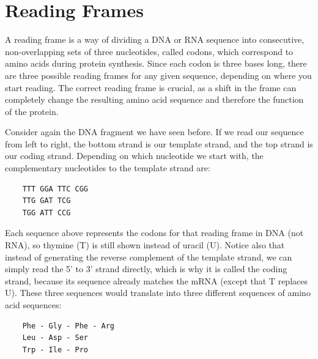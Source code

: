 \section{Reading Frames}

A reading frame is a way of dividing a DNA or RNA sequence into consecutive, non-overlapping sets of three nucleotides, called codons, which correspond to amino acids during protein synthesis. Since each codon is three bases long, there are three possible reading frames for any given sequence, depending on where you start reading. The correct reading frame is crucial, as a shift in the frame can completely change the resulting amino acid sequence and therefore the function of the protein.

Consider again the DNA fragment we have seen before. If we read our sequence from left to right, the bottom strand is our template strand, and the top strand is our coding strand. Depending on which nucleotide we start with, the complementary nucleotides to the template strand are:

\begin{verbatim}
    TTT GGA TTC CGG
    TTG GAT TCG
    TGG ATT CCG
\end{verbatim}

Each sequence
above represents the codons for that reading frame in DNA (not RNA), so thymine (T) is still shown instead of uracil (U). Notice also that instead of generating the reverse complement of the template strand, we can simply read the 5' to 3' strand directly, which is why it is called the coding strand, because its sequence already matches the mRNA (except that T replaces U). These three sequences would translate into three different sequences of amino acid sequences:
%
\begin{verbatim}
    Phe - Gly - Phe - Arg
    Leu - Asp - Ser
    Trp - Ile - Pro
\end{verbatim}

